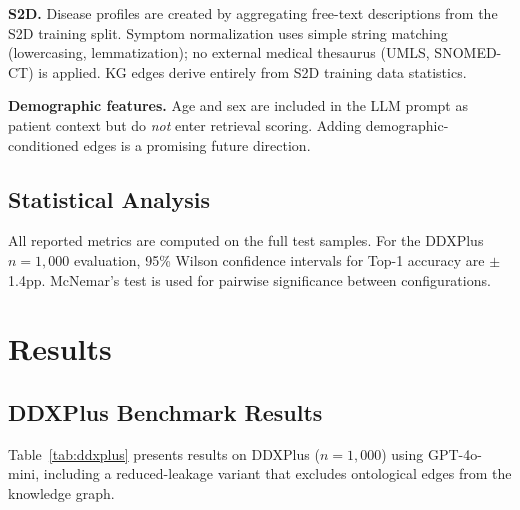 \documentclass[runningheads]{llncs}
\begin{document}
\textbf{S2D.} Disease profiles are created by aggregating free-text descriptions from the S2D training split. Symptom normalization uses simple string matching (lowercasing, lemmatization); no external medical thesaurus (UMLS, SNOMED-CT) is applied. KG edges derive entirely from S2D training data statistics.

\textbf{Demographic features.} Age and sex are included in the LLM prompt as patient context but do \emph{not} enter retrieval scoring. Adding demographic-conditioned edges is a promising future direction.

\subsection{Statistical Analysis}
\label{sec:stats}

All reported metrics are computed on the full test samples. For the DDXPlus $n{=}1{,}000$ evaluation, 95\% Wilson confidence intervals for Top-1 accuracy are $\pm$1.4pp. McNemar's test is used for pairwise significance between configurations.

\section{Results}
\label{sec:results}

\subsection{DDXPlus Benchmark Results}

Table~\ref{tab:ddxplus} presents results on DDXPlus ($n{=}1{,}000$) using GPT-4o-mini, including a reduced-leakage variant that excludes ontological edges from the knowledge graph.
\end{document}
